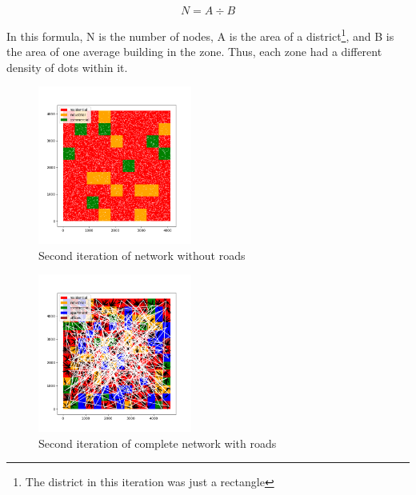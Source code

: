 \documentclass[11pt]{article}
\begin{document}
\begin{multicols}{2}
    \[N = A \div B\]

    In this formula, N is the number of nodes, A is the area of a district\footnote{The district in this iteration was just a rectangle}, and B is the area of one average building in the zone. Thus, each zone had a different density of dots within it.

    \begin{figure}[H]
        \centering
        \vspace{-1em}
        \includegraphics[width=0.45\textwidth]{images/secondzoningwnodes.png}
        \caption{Second iteration of network without roads}
        \label{fig:second-nodes}
    \end{figure}

    \begin{figure}[H]
        \centering
        \vspace{-1em}
        \includegraphics[width=0.45\textwidth]{images/secondzoningwnetwork.png}
        \caption{Second iteration of complete network with roads}
        \label{fig:second-network}
    \end{figure}


\end{multicols}
\end{document}
